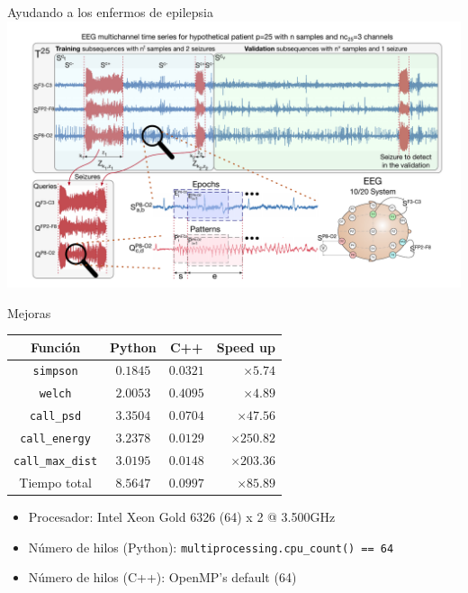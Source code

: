 \begin{frame}[t]{Ayudando a los enfermos de epilepsia}
\vspace{-.8em}
\noindent
\centering
\includegraphics[height=.9\textheight]{img/seizure.png}
\end{frame}

\begin{frame}{Mejoras}
\centering
    \begin{tabular}{ |c||c||c|r| }
      \hline
      {Función} &   
      {Python} &
      {C++} & 
      {Speed up} \\

      \hline
      \texttt{simpson} & 
      $0.1845$ &  $0.0321$ & $\times5.74$ \\

      \texttt{welch} & 
      $2.0053$ &  $0.4095$ & $\times4.89$ \\
      
      \texttt{call\_psd} & 
      $3.3504$ &  $0.0704$ & $\times47.56$ \\
      
      \texttt{call\_energy}    & 
      $3.2378$ &  $0.0129$ & $\times250.82$ \\

      \texttt{call\_max\_dist} & 
      $3.0195$ &  $0.0148$ & $\times203.36$ \\

      \hline

      Tiempo total & 
      \textbf{$8.5647$} &\textbf{$0.0997$}& \textbf{$\times85.89$} \\

      \hline
      \end{tabular}

\vfill
    \begin{itemize}
      \item Procesador: Intel Xeon Gold 6326 (64) x 2 @ 3.500GHz
      \item Número de hilos (Python): \texttt{multiprocessing.cpu\_count() == 64}
      \item Número de hilos (C++): OpenMP's default (64)
    \end{itemize}
\end{frame}

